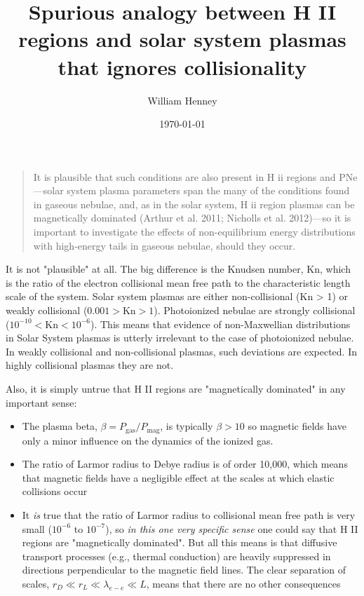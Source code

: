 \documentclass[utopia,10pt,listings-sv,microtype,paralist]{article}
\author{William Henney}
\date{\today}
\title{Spurious analogy between H II regions and solar system plasmas that ignores collisionality}
\begin{document}
\maketitle
\tableofcontents

\begin{quote}
It is plausible that such conditions are also present in H ii regions and PNe—solar system plasma parameters span the many of the conditions found in gaseous nebulae, and, as in the solar system, H ii region plasmas can be magnetically dominated (Arthur et al. 2011; Nicholls et al. 2012)—so it is important to investigate the effects of non-equilibrium energy distributions with high-energy tails in gaseous nebulae, should they occur.
\end{quote}

It is not "plausible" at all.  The big difference is the Knudsen number, \(\mathrm{Kn}\), which is the ratio of the electron collisional mean free path to the characteristic length scale of the system.  Solar system plasmas are either non-collisional (Kn > 1) or weakly collisional (\(0.001 > \mathrm{Kn} > 1\)).  Photoionized nebulae are strongly collisional (\(10^{-10} < \mathrm{Kn} < 10^{-6}\)).  This means that evidence of non-Maxwellian distributions in Solar System plasmas is utterly irrelevant to the case of photoionized nebulae.  In weakly collisional and non-collisional plasmas, such deviations are expected.  In highly collisional plasmas they are not. 

Also, it is simply untrue that H II regions are "magnetically dominated" in any important sense:
\begin{itemize}
\item The plasma beta, \(\beta = P_{\mathrm{gas}} / P_{\mathrm{mag}}\), is typically \(\beta > 10\) so magnetic fields have only a minor influence on the dynamics of the ionized gas.
\item The ratio of Larmor radius to Debye radius is of order 10,000, which means that magnetic fields have a negligible effect at the scales at which elastic collisions occur
\item It \emph{is} true that the ratio of Larmor radius to collisional mean free path is very small (\(10^{-6}\) to \(10^{{-7}}\)), so \emph{in this one very specific sense} one could say that H II regions are "magnetically dominated".  But all this means is that diffusive transport processes (e.g., thermal conduction) are heavily suppressed in directions perpendicular to the magnetic field lines.   The clear separation of scales, \(r_{D} \ll r_{L} \ll \lambda_{e-e} \ll L\), means that there are no other consequences
\end{itemize}
\end{document}

